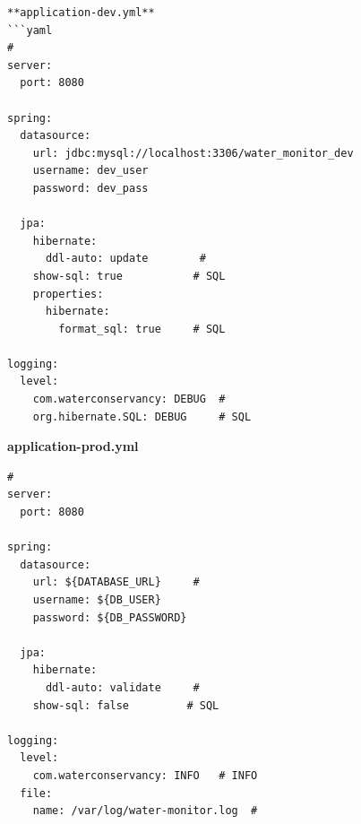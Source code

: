 \begin{verbatim}
**application-dev.yml**
```yaml
# 
server:
  port: 8080

spring:
  datasource:
    url: jdbc:mysql://localhost:3306/water_monitor_dev
    username: dev_user
    password: dev_pass
    
  jpa:
    hibernate:
      ddl-auto: update        # 
    show-sql: true           # SQL
    properties:
      hibernate:
        format_sql: true     # SQL

logging:
  level:
    com.waterconservancy: DEBUG  # 
    org.hibernate.SQL: DEBUG     # SQL
\end{verbatim}

\textbf{application-prod.yml}

\begin{verbatim}
# 
server:
  port: 8080

spring:
  datasource:
    url: ${DATABASE_URL}     # 
    username: ${DB_USER}
    password: ${DB_PASSWORD}
    
  jpa:
    hibernate:
      ddl-auto: validate     # 
    show-sql: false         # SQL
    
logging:
  level:
    com.waterconservancy: INFO   # INFO
  file:
    name: /var/log/water-monitor.log  # 
\end{verbatim}

